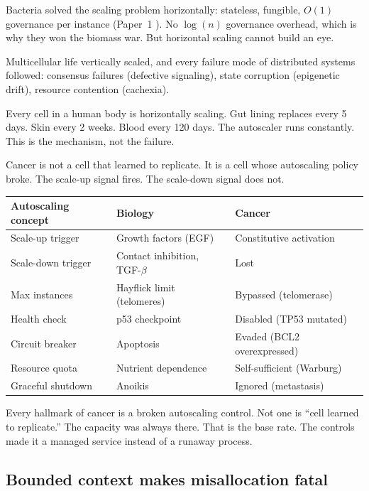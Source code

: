 \documentclass[11pt]{article}
\theoremstyle{definition}
\begin{document}
Bacteria solved the scaling problem horizontally: stateless, fungible,
$O(1)$ governance per instance (Paper~1 \cite{McCarthy2026_BCA}). No
$\log(n)$ governance overhead, which is why they won the biomass war.
But horizontal scaling cannot build an eye.

Multicellular life vertically scaled, and every failure mode of
distributed systems followed: consensus failures (defective signaling),
state corruption (epigenetic drift), resource contention (cachexia).

Every cell in a human body is horizontally scaling. Gut lining
replaces every 5 days. Skin every 2 weeks. Blood every 120 days.
The autoscaler runs constantly. This is the mechanism, not the
failure.

Cancer is not a cell that learned to replicate. It is a cell whose
autoscaling policy broke. The scale-up signal fires. The scale-down
signal does not.

\begin{center}
\small
\begin{tabular}{lll}
\toprule
\textbf{Autoscaling concept} & \textbf{Biology} & \textbf{Cancer} \\
\midrule
Scale-up trigger & Growth factors (EGF) & Constitutive activation \\
Scale-down trigger & Contact inhibition, TGF-$\beta$ & Lost \\
Max instances & Hayflick limit (telomeres) & Bypassed (telomerase) \\
Health check & p53 checkpoint & Disabled (TP53 mutated) \\
Circuit breaker & Apoptosis & Evaded (BCL2 overexpressed) \\
Resource quota & Nutrient dependence & Self-sufficient (Warburg) \\
Graceful shutdown & Anoikis & Ignored (metastasis) \\
\bottomrule
\end{tabular}
\end{center}

Every hallmark of cancer \cite{Hanahan2011} is a broken autoscaling
control. Not one is ``cell learned to replicate.'' The capacity was
always there. That is the base rate. The controls made it a managed
service instead of a runaway process.

\subsection{Bounded context makes misallocation fatal}
\end{document}
